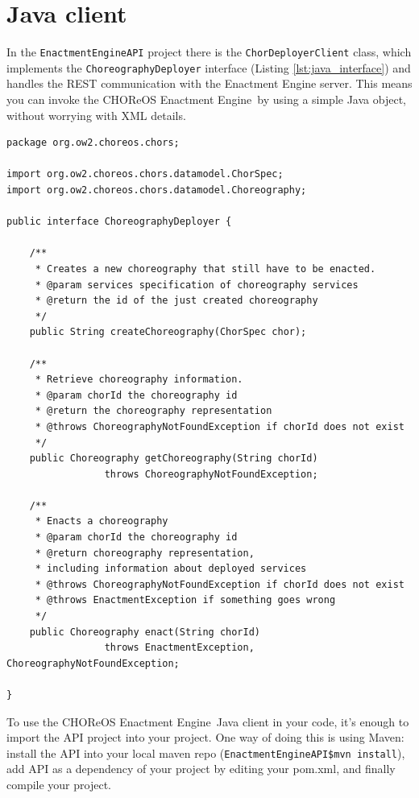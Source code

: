 \documentclass[a4paper, 10pt]{article}
\newcommand{\ee}{CHOReOS Enactment Engine}
\begin{document}
\section{Java client}
\label{sec:client}

In the \verb!EnactmentEngineAPI! project there is the \verb!ChorDeployerClient! class, which implements the \verb!ChoreographyDeployer! interface (Listing \ref{lst:java_interface}) and handles the REST communication with the Enactment Engine server. This means you can invoke the \ee\ by using a simple Java object, without worrying with XML details.

\lstset{language=Java}
\begin{lstlisting}[caption=\ee\ Java interface, label=lst:java_interface]
package org.ow2.choreos.chors;

import org.ow2.choreos.chors.datamodel.ChorSpec;
import org.ow2.choreos.chors.datamodel.Choreography;

public interface ChoreographyDeployer {
	
	/**
	 * Creates a new choreography that still have to be enacted.
	 * @param services specification of choreography services
	 * @return the id of the just created choreography
	 */
	public String createChoreography(ChorSpec chor);
	
	/**
	 * Retrieve choreography information.
	 * @param chorId the choreography id
	 * @return the choreography representation
	 * @throws ChoreographyNotFoundException if chorId does not exist 
	 */
	public Choreography getChoreography(String chorId) 
	             throws ChoreographyNotFoundException;

	/**
	 * Enacts a choreography
	 * @param chorId the choreography id
	 * @return choreography representation, 
	 * including information about deployed services 
	 * @throws ChoreographyNotFoundException if chorId does not exist 
	 * @throws EnactmentException if something goes wrong 
	 */
	public Choreography enact(String chorId) 
	             throws EnactmentException, ChoreographyNotFoundException;
	
}
\end{lstlisting}

To use the \ee\ Java client in your code, it's enough to import the API project into your project. One way of doing this is using Maven: install the API into your local maven repo (\texttt{EnactmentEngineAPI\$mvn install}), add API as a dependency of your project by editing your pom.xml, and finally compile your project.
\end{document}
